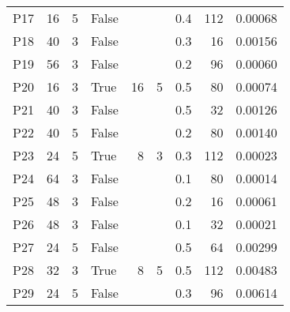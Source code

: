 \begin{table}[H]
\begin{tabular}{lrrlrrrrr}
        P17 & 16 & 5 & False &    &   & 0.4 & 112 & 0.00068 \\
        P18 & 40 & 3 & False &    &   & 0.3 & 16  & 0.00156 \\
        P19 & 56 & 3 & False &    &   & 0.2 & 96  & 0.00060 \\
        P20 & 16 & 3 & True  & 16 & 5 & 0.5 & 80  & 0.00074 \\
        P21 & 40 & 3 & False &    &   & 0.5 & 32  & 0.00126 \\
        P22 & 40 & 5 & False &    &   & 0.2 & 80  & 0.00140 \\
        P23 & 24 & 5 & True  & 8  & 3 & 0.3 & 112 & 0.00023 \\
        P24 & 64 & 3 & False &    &   & 0.1 & 80  & 0.00014 \\
        P25 & 48 & 3 & False &    &   & 0.2 & 16  & 0.00061 \\
        P26 & 48 & 3 & False &    &   & 0.1 & 32  & 0.00021 \\
        P27 & 24 & 5 & False &    &   & 0.5 & 64  & 0.00299 \\
        P28 & 32 & 3 & True  & 8  & 5 & 0.5 & 112 & 0.00483 \\
        P29 & 24 & 5 & False &    &   & 0.3 & 96  & 0.00614 \\
        \hline
    \end{tabular}
\end{table}
